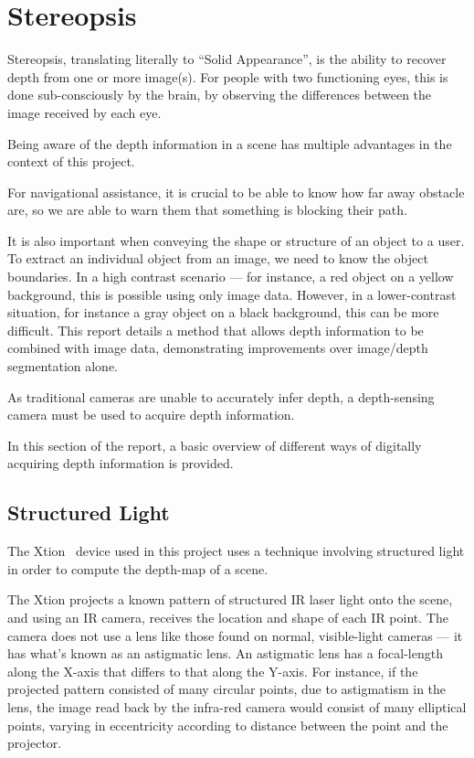 \section{Stereopsis}
Stereopsis, translating literally to ``Solid Appearance'', is the ability to recover depth from one or more image(s). For people with two functioning eyes, this is done sub-consciously by the brain, by observing the differences between the image received by each eye.

Being aware of the depth information in a scene has multiple advantages in the context of this project.

For navigational assistance, it is crucial to be able to know how far away obstacle are, so we are able to warn them that something is blocking their path.

It is also important when conveying the shape or structure of an object to a user. To extract an individual object from an image, we need to know the object boundaries. In a high contrast scenario --- for instance, a red object on a yellow background, this is possible using only image data. However, in a lower-contrast situation, for instance a gray object on a black background, this can be more difficult. This report details a method that allows depth information to be combined with image data, demonstrating improvements over image/depth segmentation alone. 

As traditional cameras are unable to accurately infer depth, a depth-sensing camera must be used to acquire depth information.

In this section of the report, a basic overview of different ways of digitally acquiring depth information is provided.

\subsection{Structured Light}
The Xtion~\cite{xtion} device used in this project uses a technique involving structured light in order to compute the depth-map of a scene.

The Xtion projects a known pattern of structured \ac{IR} laser light onto the scene, and using an \ac{IR} camera, receives the location and shape of each \ac{IR} point. The camera does not use a lens like those found on normal, visible-light cameras --- it has what's known as an astigmatic lens. An astigmatic lens has a focal-length along the X-axis that differs to that along the Y-axis. For instance, if the projected pattern consisted of many circular points, due to astigmatism in the lens, the image read back by the infra-red camera would consist of many elliptical points, varying in eccentricity according to distance between the point and the projector.

